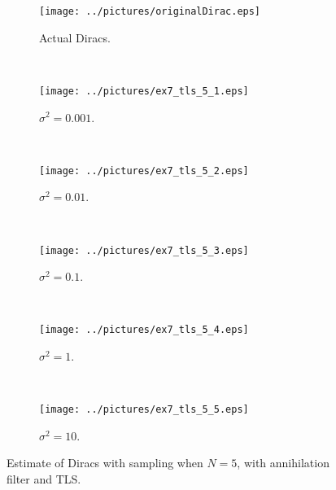 \documentclass[11pt,a4paper]{report}
\begin{document}
\begin{figure}[H]
    \captionsetup[subfigure]{position=b}
    \centering
    \begin{subfigure}{0.49\textwidth}
        \texttt{[image: ../pictures/originalDirac.eps]}
        \caption{Actual Diracs.}
        \label{fig:ex7_tls_5_0}
    \end{subfigure}
    ~
    \begin{subfigure}{0.49\textwidth}
        \texttt{[image: ../pictures/ex7\_tls\_5\_1.eps]}
        \caption{$\sigma^2 = 0.001$.}
        \label{fig:ex7_tls_5_1}
    \end{subfigure}
    \\
    \begin{subfigure}{0.49\textwidth}
        \texttt{[image: ../pictures/ex7\_tls\_5\_2.eps]}
        \caption{$\sigma^2 = 0.01$.}
        \label{fig:ex7_tls_5_2}
    \end{subfigure}
    ~
    \begin{subfigure}{0.49\textwidth}
        \texttt{[image: ../pictures/ex7\_tls\_5\_3.eps]}
        \caption{$\sigma^2 = 0.1$.}
        \label{fig:ex7_tls_5_3}
    \end{subfigure}
    \\
    \begin{subfigure}{0.49\textwidth}
        \texttt{[image: ../pictures/ex7\_tls\_5\_4.eps]}
        \caption{$\sigma^2 = 1$.}
        \label{fig:ex7_tls_5_4}
    \end{subfigure}
    ~
    \begin{subfigure}{0.49\textwidth}
        \texttt{[image: ../pictures/ex7\_tls\_5\_5.eps]}
        \caption{$\sigma^2 = 10$.}
        \label{fig:ex7_tls_5_5}
    \end{subfigure}

    \caption{Estimate of Diracs with sampling when $N = 5$, with annihilation filter and TLS.}
    \label{fig:ex7_tls_5}
\end{figure}
\end{document}
